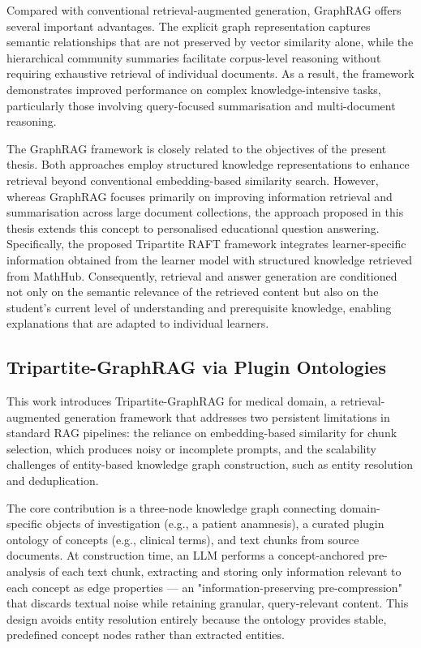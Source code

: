 Compared with conventional retrieval-augmented generation, GraphRAG offers several important advantages. The explicit graph representation captures semantic relationships that are not preserved by vector similarity alone, while the hierarchical community summaries facilitate corpus-level reasoning without requiring exhaustive retrieval of individual documents. As a result, the framework demonstrates improved performance on complex knowledge-intensive tasks, particularly those involving query-focused summarisation and multi-document reasoning.

The GraphRAG framework is closely related to the objectives of the present thesis. Both approaches employ structured knowledge representations to enhance retrieval beyond conventional embedding-based similarity search. However, whereas GraphRAG focuses primarily on improving information retrieval and summarisation across large document collections, the approach proposed in this thesis extends this concept to personalised educational question answering. Specifically, the proposed Tripartite RAFT framework integrates learner-specific information obtained from the learner model with structured knowledge retrieved from MathHub. Consequently, retrieval and answer generation are conditioned not only on the semantic relevance of the retrieved content but also on the student's current level of understanding and prerequisite knowledge, enabling explanations that are adapted to individual learners.


\subsection{Tripartite-GraphRAG via Plugin Ontologies}

This work \cite{banf2025tripartitegraphragpluginontologies} introduces Tripartite-GraphRAG for medical domain, a retrieval-augmented generation framework that addresses two persistent limitations in standard RAG pipelines: the reliance on embedding-based similarity for chunk selection, which produces noisy or incomplete prompts, and the scalability challenges of entity-based knowledge graph construction, such as entity resolution and deduplication.

The core contribution is a three-node knowledge graph connecting domain-specific objects of investigation (e.g., a patient anamnesis), a curated plugin ontology of concepts (e.g., clinical terms), and text chunks from source documents. At construction time, an LLM performs a concept-anchored pre-analysis of each text chunk, extracting and storing only information relevant to each concept as edge properties — an "information-preserving pre-compression" that discards textual noise while retaining granular, query-relevant content. This design avoids entity resolution entirely because the ontology provides stable, predefined concept nodes rather than extracted entities.

